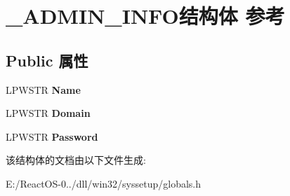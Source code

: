 \hypertarget{struct___a_d_m_i_n___i_n_f_o}{}\section{\+\_\+\+A\+D\+M\+I\+N\+\_\+\+I\+N\+F\+O结构体 参考}
\label{struct___a_d_m_i_n___i_n_f_o}
\subsection*{Public 属性}
\begin{DoxyCompactItemize}
\item 
\mbox{\label{struct___a_d_m_i_n___i_n_f_o_a942e0dfc2c3604f9fe5bf921c68f9cd5}} 
L\+P\+W\+S\+TR {\bfseries Name}
\item 
\mbox{\label{struct___a_d_m_i_n___i_n_f_o_ac9569f480154fcc812b92f473836b605}} 
L\+P\+W\+S\+TR {\bfseries Domain}
\item 
\mbox{\label{struct___a_d_m_i_n___i_n_f_o_a2cf3099bb65570a4813c5ab9466ff30b}} 
L\+P\+W\+S\+TR {\bfseries Password}
\end{DoxyCompactItemize}


该结构体的文档由以下文件生成\+:\begin{DoxyCompactItemize}
\item 
E\+:/\+React\+O\+S-\/0../dll/win32/syssetup/globals.\+h\end{DoxyCompactItemize}
